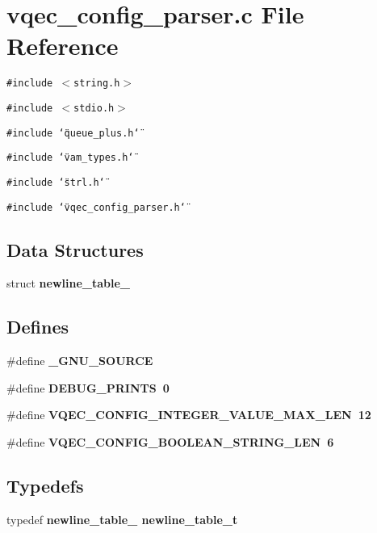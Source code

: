 \section{vqec\_\-config\_\-parser.c File Reference}
\label{vqec__config__parser_8c}
{\tt \#include $<$string.h$>$}\par
{\tt \#include $<$stdio.h$>$}\par
{\tt \#include \char`\"{}queue\_\-plus.h\char`\"{}}\par
{\tt \#include \char`\"{}vam\_\-types.h\char`\"{}}\par
{\tt \#include \char`\"{}strl.h\char`\"{}}\par
{\tt \#include \char`\"{}vqec\_\-config\_\-parser.h\char`\"{}}\par
\subsection*{Data Structures}
\begin{CompactItemize}
\item 
struct \bf{newline\_\-table\_\-}
\end{CompactItemize}
\subsection*{Defines}
\begin{CompactItemize}
\item 
\#define \bf{\_\-GNU\_\-SOURCE}
\item 
\#define \bf{DEBUG\_\-PRINTS}~0
\item 
\#define \bf{VQEC\_\-CONFIG\_\-INTEGER\_\-VALUE\_\-MAX\_\-LEN}~12
\item 
\#define \bf{VQEC\_\-CONFIG\_\-BOOLEAN\_\-STRING\_\-LEN}~6
\end{CompactItemize}
\subsection*{Typedefs}
\begin{CompactItemize}
\item 
typedef \bf{newline\_\-table\_\-} \bf{newline\_\-table\_\-t}
\end{CompactItemize}
